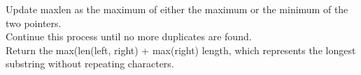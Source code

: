 \documentclass[preview]{standalone}
\begin{document}
Update maxlen as the maximum of either the maximum or the minimum of the two pointers.\\Continue this process until no more duplicates are found.\\Return the max(len(left, right) + max(right) length, which represents the longest substring without repeating characters.\\
\end{document}
